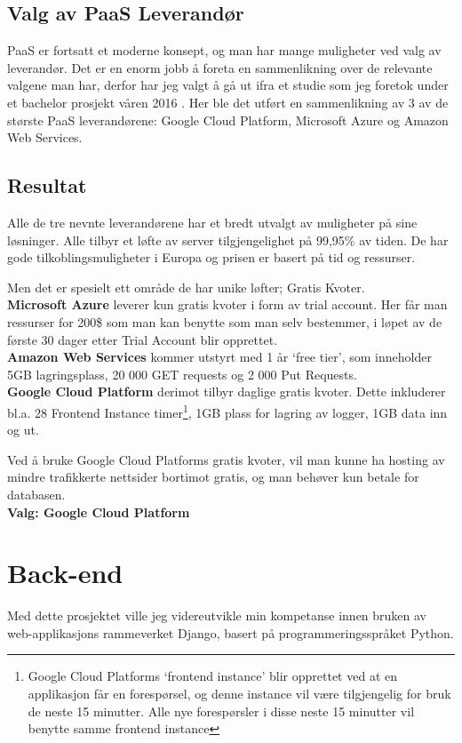 \subsection{Valg av PaaS Leverandør}
PaaS er fortsatt et moderne konsept, og man har mange muligheter ved valg av leverandør. Det er en enorm jobb å foreta en sammenlikning over de relevante valgene man har, derfor har jeg valgt å gå ut ifra et studie som jeg foretok under et bachelor prosjekt våren 2016 \cite[s. 18]{bachelor}. Her ble det utført en sammenlikning av 3 av de største PaaS leverandørene: Google Cloud Platform, Microsoft Azure og Amazon Web Services. 


\subsection*{Resultat}
Alle de tre nevnte leverandørene har et bredt utvalgt av muligheter på sine løsninger. Alle tilbyr et løfte av server tilgjengelighet på 99,95\% av tiden. De har gode tilkoblingsmuligheter i Europa og prisen er basert på tid og ressurser.

Men det er spesielt ett område de har unike løfter; Gratis Kvoter. \\
\textbf{Microsoft Azure} leverer kun gratis kvoter i form av trial account. Her får man ressurser for 200\$ som man kan benytte som man selv bestemmer, i løpet av de første 30 dager etter Trial Account blir opprettet.\\
\textbf{Amazon  Web Services} kommer utstyrt med 1 år ‘free tier’, som inneholder 5GB lagringsplass, 20 000 GET requests og 2 000 Put Requests.\\
\textbf{Google Cloud Platform} derimot tilbyr daglige gratis kvoter. Dette inkluderer bl.a. 28 Frontend Instance timer\footnote{Google Cloud Platforms ‘frontend instance’ blir opprettet ved at en applikasjon får en forespørsel, og denne instance vil være tilgjengelig for bruk de neste 15 minutter. Alle nye forespørsler i disse neste 15 minutter vil benytte samme frontend instance}, 1GB plass for lagring av logger, 1GB data inn og ut.


Ved å bruke Google Cloud Platforms gratis kvoter, vil man kunne ha hosting av mindre trafikkerte nettsider bortimot gratis, og man behøver kun betale for databasen.\\
\textbf{Valg: Google Cloud Platform}



\newpage
\section{Back-end}
Med dette prosjektet ville jeg videreutvikle min kompetanse innen bruken av web-applikasjons rammeverket Django, basert på programmeringsspråket Python. 
